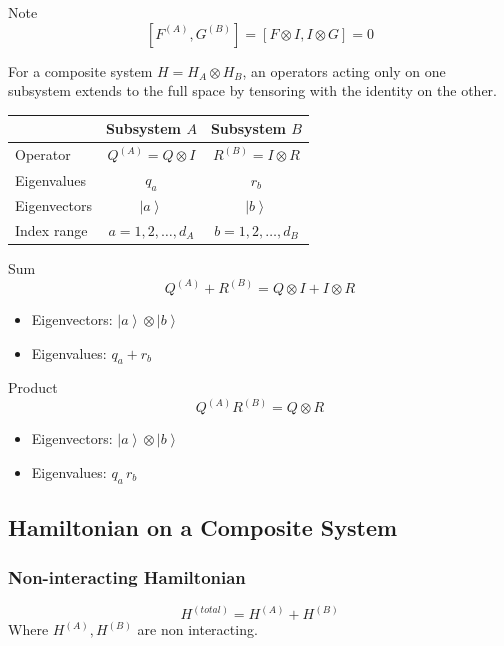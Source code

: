 \documentclass[
]{article}
\providecommand{\ket}[1]{\left\lvert #1 \right\rangle}
\begin{document}
Note
\[
	\boxed{[F^{(A)}, G^{(B)}]= [F\otimes I, I\otimes G]=0}
\]

For a composite system $H = H_A \otimes H_B$, an operators acting only on one subsystem extends to the full space by tensoring with the identity on the other.

\begin{tabular}{|l|c|c|}
	\hline
	             & Subsystem $A$           & Subsystem $B$           \\
	\hline
	Operator     & $Q^{(A)} = Q \otimes I$ & $R^{(B)} = I \otimes R$ \\
	Eigenvalues  & $q_a$                   & $r_b$                   \\
	Eigenvectors & $\ket{a}$               & $\ket{b}$               \\
	Index range  & $a = 1, 2, \dots, d_A$  & $b = 1, 2, \dots, d_B$  \\
	\hline
\end{tabular}

Sum
\[
	Q^{(A)} + R^{(B)} = Q \otimes I + I \otimes R
\]
\begin{itemize}
	\item Eigenvectors: $\ket{a} \otimes \ket{b}$
	\item Eigenvalues: $q_a + r_b$
\end{itemize}

Product
\[
	Q^{(A)} R^{(B)} = Q \otimes R
\]
\begin{itemize}
	\item Eigenvectors: $\ket{a} \otimes \ket{b}$
	\item Eigenvalues: $q_a\, r_b$
\end{itemize}


\subsection{Hamiltonian on a Composite System}\label{hamiltonian-of-composite-systems}
\subsubsection{Non-interacting Hamiltonian}\label{non-interacting-hamiltonian}
\[
	H^{(total)}=H^{(A)}+H^{(B)}
\]
Where $H^{(A)}, H^{(B)}$ are non interacting.
\end{document}

